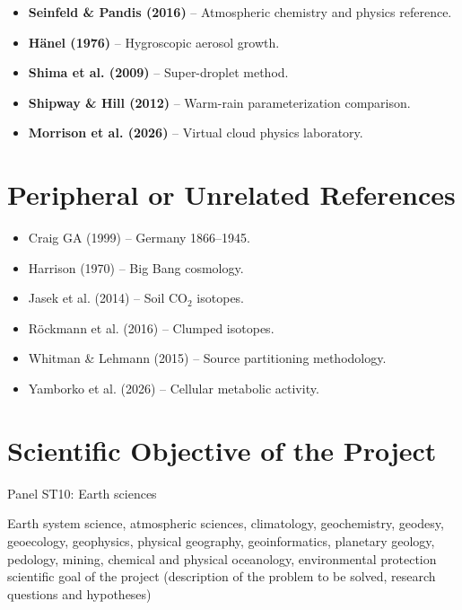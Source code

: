 \documentclass[11pt,a4paper]{article}
\begin{document}

\begin{itemize}
    \item \textbf{Seinfeld \& Pandis (2016)} -- Atmospheric chemistry and physics reference.
    \item \textbf{Hänel (1976)} -- Hygroscopic aerosol growth.
    \item \textbf{Shima et al. (2009)} -- Super-droplet method.
    \item \textbf{Shipway \& Hill (2012)} -- Warm-rain parameterization comparison.
    \item \textbf{Morrison et al. (2026)} -- Virtual cloud physics laboratory.
\end{itemize}

\section{Peripheral or Unrelated References}

\begin{itemize}
    \item Craig GA (1999) -- Germany 1866--1945.
    \item Harrison (1970) -- Big Bang cosmology.
    \item Jasek et al. (2014) -- Soil CO$_2$ isotopes.
    \item Röckmann et al. (2016) -- Clumped isotopes.
    \item Whitman \& Lehmann (2015) -- Source partitioning methodology.
    \item Yamborko et al. (2026) -- Cellular metabolic activity.
\end{itemize}

\section{Scientific Objective of the Project}
Panel ST10: Earth sciences

Earth system science, atmospheric sciences, climatology, geochemistry, geodesy, geoecology, geophysics,
physical geography, geoinformatics, planetary geology, pedology, mining, chemical and physical oceanology,
environmental protection
scientific goal of the project (description of the problem to be solved, research questions and hypotheses)
\end{document}
